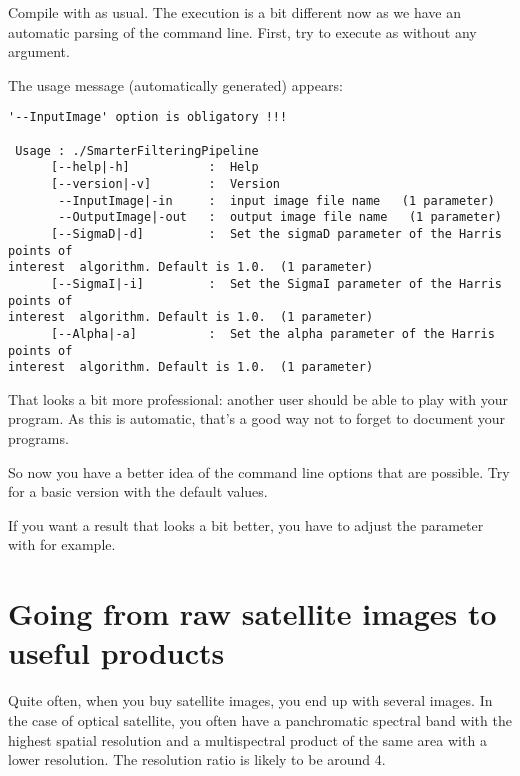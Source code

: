 Compile with  as usual. The execution is a bit different now as we
have an automatic parsing of the command line. First, try to execute as
 without any argument.

The usage message (automatically generated) appears:

\begin{small}
\begin{verbatim}
'--InputImage' option is obligatory !!!

 Usage : ./SmarterFilteringPipeline
      [--help|-h]           :  Help
      [--version|-v]        :  Version
       --InputImage|-in     :  input image file name   (1 parameter)
       --OutputImage|-out   :  output image file name   (1 parameter)
      [--SigmaD|-d]         :  Set the sigmaD parameter of the Harris points of
interest  algorithm. Default is 1.0.  (1 parameter)
      [--SigmaI|-i]         :  Set the SigmaI parameter of the Harris points of
interest  algorithm. Default is 1.0.  (1 parameter)
      [--Alpha|-a]          :  Set the alpha parameter of the Harris points of
interest  algorithm. Default is 1.0.  (1 parameter)
\end{verbatim}
\end{small}

That looks a bit more professional: another user should be able to play with
your program. As this is automatic, that's a good way not to forget to
document your programs.

So now you have a better idea of the command line options that are possible. Try
 for a basic
version with the default values.

If you want a result that looks a bit better, you have to adjust the
parameter with  for example.



\section{Going from raw satellite images to useful products}

Quite often, when you buy satellite images, you end up with several images. In the case of optical satellite, you often have a panchromatic spectral band with the highest spatial resolution and a multispectral product of the same area with a lower resolution. The resolution ratio is likely to be around 4.

